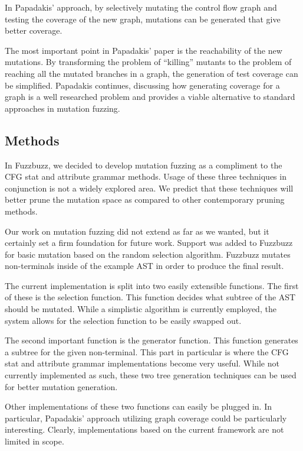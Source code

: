 In Papadakis' approach, by selectively mutating the control flow graph
and testing the coverage of the new graph, mutations can be generated
that give better coverage.

The most important point in Papadakis' paper is the reachability of
the new mutations. By transforming the problem of ``killing'' mutants
to the problem of reaching all the mutated branches in a graph, the
generation of test coverage can be simplified. Papadakis continues,
discussing how generating coverage for a graph is a well researched
problem and provides a viable alternative to standard approaches in
mutation fuzzing.


\subsection{Methods}

In Fuzzbuzz, we decided to develop mutation fuzzing as a compliment to
the CFG stat and attribute grammar methods. Usage of these three
techniques in conjunction is not a widely explored area. We predict
that these techniques will better prune the mutation space as compared
to other contemporary pruning methods.

Our work on mutation fuzzing did not extend as far as we wanted, but
it certainly set a firm foundation for future work. Support was added
to Fuzzbuzz for basic mutation based on the random selection
algorithm. Fuzzbuzz mutates non-terminals inside of the example AST in
order to produce the final result.

The current implementation is split into two easily extensible
functions. The first of these is the selection function. This function
decides what subtree of the AST should be mutated. While a simplistic
algorithm is currently employed, the system allows for the selection
function to be easily swapped out.

The second important function is the generator function. This function
generates a subtree for the given non-terminal. This part in
particular is where the CFG stat and attribute grammar implementations
become very useful. While not currently implemented as such, these two
tree generation techniques can be used for better mutation generation.

Other implementations of these two functions can easily be plugged
in. In particular, Papadakis' approach utilizing graph coverage could
be particularly interesting. Clearly, implementations based on the
current framework are not limited in scope.

